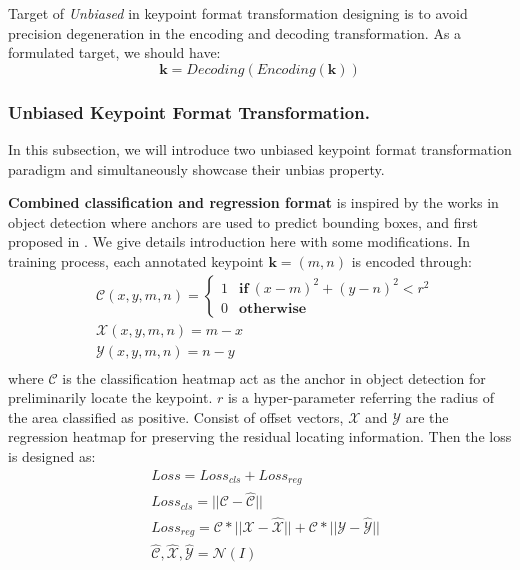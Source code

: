 \documentclass[10pt,journal,compsoc]{IEEEtran}
\begin{document}
Target of \textit{Unbiased} in keypoint format transformation designing is to avoid precision degeneration in the encoding and decoding transformation. As a formulated target, we should have:
\begin{equation}
\label{eq:target}
    \textbf{k} = Decoding(Encoding(\textbf{k}))
\end{equation}

\subsubsection{Unbiased Keypoint Format Transformation.}
In this subsection, we will introduce two unbiased keypoint format transformation paradigm and simultaneously showcase their unbias property.

\textbf{Combined classification and regression format} is inspired by the works in object detection \cite{ren2016faster} where anchors are used to predict bounding boxes, and first proposed in \cite{G-RMI}. We give details introduction here with some modifications. In training process, each annotated keypoint $\textbf{k}=(m,n)$ is encoded through:
\begin{equation}
\label{eq:combinedencoding}
    \begin{split}
    &\mathcal{C}(x,y,m,n)= \begin{cases} 1  & \textbf{if} \ (x-m)^2+(y-n)^2<r^2 \\
                                                    0  & \textbf{otherwise}
    \end{cases}\\
    &\mathcal{X}(x,y,m,n)= m - x\\
    &\mathcal{Y}(x,y,m,n)= n - y\\
    \end{split}
\end{equation}
where $\mathcal{C}$ is the classification heatmap act as the anchor in object detection for preliminarily locate the keypoint. $r$ is a hyper-parameter referring the radius of the area classified as positive. Consist of offset vectors, $\mathcal{X}$ and $\mathcal{Y}$ are the regression heatmap for preserving the residual locating information. Then the loss is designed as:
\begin{equation}
    \begin{split}
    &Loss =  Loss_{cls} + Loss_{reg}\\
    &Loss_{cls} = ||\mathcal{C}-\hat{\mathcal{C}}||\\
    &Loss_{reg} = \mathcal{C} * ||\mathcal{X}-\hat{\mathcal{X}}|| + \mathcal{C} * ||\mathcal{Y}-\hat{\mathcal{Y}}||\\
    &\hat{\mathcal{C}}, \hat{\mathcal{X}}, \hat{\mathcal{Y}} = \mathcal{N}(I)
    \end{split}
\end{equation}
\end{document}
